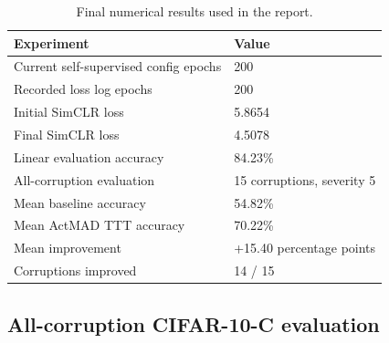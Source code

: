 \documentclass[a4paper,11pt]{article}
\begin{document}
\begin{table}[H]
\centering
\caption{Final numerical results used in the report.}
\label{tab:final-summary}
\begin{tabular}{ll}
\toprule
Experiment & Value\\
\midrule
Current self-supervised config epochs & 200\\
Recorded loss log epochs & 200\\
Initial SimCLR loss & 5.8654\\
Final SimCLR loss & 4.5078\\
Linear evaluation accuracy & 84.23\%\\
All-corruption evaluation & 15 corruptions, severity 5\\
Mean baseline accuracy & 54.82\%\\
Mean ActMAD TTT accuracy & 70.22\%\\
Mean improvement & +15.40 percentage points\\
Corruptions improved & 14 / 15\\
\bottomrule
\end{tabular}
\end{table}

\subsection{All-corruption CIFAR-10-C evaluation}
\end{document}
